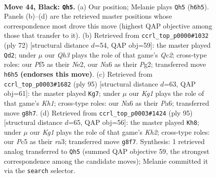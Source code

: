 \documentclass[11pt]{article}
\begin{document}
\clearpage

\begin{figure}[p]\centering
\begin{subfigure}{0.46\textwidth}\centering
\resizebox{\linewidth}{!}{%
\newchessgame
\chessboard[
  setfen={3r2k1/pp6/n2P3q/2p1Qp2/8/P5P1/1P3K2/R2R4 b - - 0 44},
  showmover=false,
  pgfstyle=straightmove, color=movearrow, markmove={h6-h5}
]}
\caption{}
\end{subfigure}\hfill
\begin{subfigure}{0.46\textwidth}\centering
\resizebox{\linewidth}{!}{%
\newchessgame
\chessboard[
  setfen={4n1k1/2p2r2/7p/3Pq3/5p2/5R1P/2Q1N1P1/7K w - - 2 37},
  showmover=false,
  pgfstyle=straightmove, color=movearrow, markmove={c2-d2}
]}
\caption{}
\end{subfigure}
\\[4pt]
\begin{subfigure}{0.46\textwidth}\centering
\resizebox{\linewidth}{!}{%
\newchessgame
\chessboard[
  setfen={4r2k/4Pq2/p5p1/7p/pQ6/P7/1P6/K3R3 b - - 2 48},
  showmover=false,
  pgfstyle=straightmove, color=movearrow, markmove={h8-g7}
]}
\caption{}
\end{subfigure}\hfill
\begin{subfigure}{0.46\textwidth}\centering
\resizebox{\linewidth}{!}{%
\newchessgame
\chessboard[
  setfen={8/2r3pk/5n1p/2P2q2/8/R3QP2/P7/K1R5 b - - 2 48},
  showmover=false,
  pgfstyle=straightmove, color=movearrow, markmove={h7-h8}
]}
\caption{}
\end{subfigure}
\caption{\textbf{Move 44, Black: \texttt{Qh5}.} (a) Our position; Melanie plays \texttt{Qh5} (\texttt{h6h5}). Panels (b)--(d) are the retrieved master positions whose correspondence most drove this move (highest QAP objective among those that transfer to it). (b) Retrieved from \texttt{ccrl\_top\_p0000\#1032} (ply 72) [structural distance $d$=54, QAP obj=59]: the master played \texttt{Qd2}; under $\mu$ our \emph{Qh3} plays the role of that game's \emph{Qc2}; cross-type roles: our \emph{P}f5 as their \emph{N}e2, our \emph{N}a6 as their \emph{P}g2; transferred move \texttt{h6h5} \textbf{(endorses this move)}. (c) Retrieved from \texttt{ccrl\_top\_p0003\#1682} (ply 95) [structural distance $d$=63, QAP obj=61]: the master played \texttt{Kg7}; under $\mu$ our \emph{Kg1} plays the role of that game's \emph{Kh1}; cross-type roles: our \emph{N}a6 as their \emph{P}a6; transferred move \texttt{g8h7}. (d) Retrieved from \texttt{ccrl\_top\_p0003\#1424} (ply 95) [structural distance $d$=65, QAP obj=56]: the master played \texttt{Kh8}; under $\mu$ our \emph{Kg1} plays the role of that game's \emph{Kh2}; cross-type roles: our \emph{P}c5 as their \emph{r}a3; transferred move \texttt{g8f7}. Synthesis: 1 retrieved analog transferred to \texttt{Qh5} (summed QAP objective 59, the strongest correspondence among the candidate moves); Melanie committed it via the \texttt{search} selector.}
\label{fig:thought-m87}
\end{figure}
\end{document}
